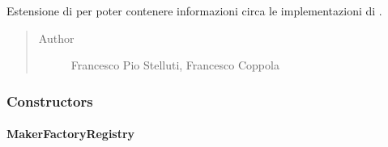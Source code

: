 \documentclass[letterpaper,10pt,italian,openany,oneside]{sphinxmanual}
\begin{document}
\begin{fulllineitems}
\label{\detokenize{test/it/unicam/cs/pa/mastermind/factories/MakerFactoryRegistry:it.unicam.cs.pa.mastermind.factories.MakerFactoryRegistry}}
Estensione di  per poter contenere informazioni circa le implementazioni di .
\begin{quote}\begin{description}
\item[{Author}] \leavevmode
Francesco Pio Stelluti, Francesco Coppola

\end{description}\end{quote}

\end{fulllineitems}



\subsubsection{Constructors}
\label{\detokenize{test/it/unicam/cs/pa/mastermind/factories/MakerFactoryRegistry:constructors}}

\paragraph{MakerFactoryRegistry}
\label{\detokenize{test/it/unicam/cs/pa/mastermind/factories/MakerFactoryRegistry:id1}}
\end{document}
